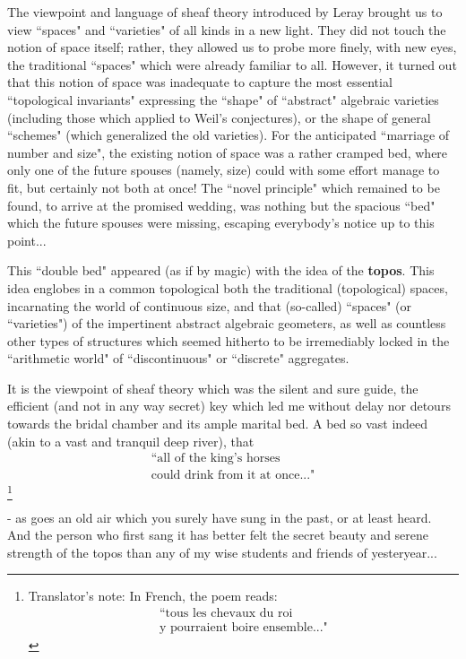 The viewpoint and language of sheaf theory introduced by Leray brought us to view ``spaces" and ``varieties" of all kinds in a new light. They did not touch the notion of space itself; rather, they allowed us to probe more finely, with new eyes, the traditional ``spaces" which were already familiar to all. However, it turned out that this notion of space was inadequate to capture the most essential ``topological invariants" expressing the ``shape" of ``abstract" algebraic varieties (including those which applied to Weil's conjectures), or the shape of general ``schemes" (which generalized the old varieties). For the anticipated ``marriage of number and size", the existing notion of space was a rather cramped bed, where only one of the future spouses (namely, size) could with some effort manage to fit, but certainly not both at once! The ``novel principle" which remained to be found, to arrive at the promised wedding, was nothing but the spacious ``bed" which the future spouses were missing, escaping everybody's notice up to this point...

This ``double bed" appeared (as if by magic) with the idea of the \textbf{topos}. This idea englobes in a common topological both the traditional (topological) spaces, incarnating the world of continuous size, and that (so-called) ``spaces" (or ``varieties") of the impertinent abstract algebraic geometers, as well as countless other types of structures which seemed hitherto to be irremediably locked in the ``arithmetic world" of ``discontinuous" or ``discrete" aggregates.

It is the viewpoint of sheaf theory which was the silent and sure guide, the efficient (and not in any way secret) key which led me without delay nor detours towards the bridal chamber and its ample marital bed. A bed so vast indeed (akin to a vast and tranquil deep river), that  
\begin{equation*} \begin{split}
\text{``all of the king's horses} \\
\text{could drink from it at once..."} 
\end{split} \end{equation*}
\footnote{Translator's note: In French, the poem reads:
\begin{equation*} \begin{split}
\text{``tous les chevaux du roi} \\
\text{y pourraient boire ensemble..."}
\end{split} \end{equation*} }
\addtocounter{footnote}{-1}
- as goes an old air which you surely have sung in the past, or at least heard. And the person who first sang it has better felt the secret beauty and serene strength of the topos than any of my wise students and friends of yesteryear...

